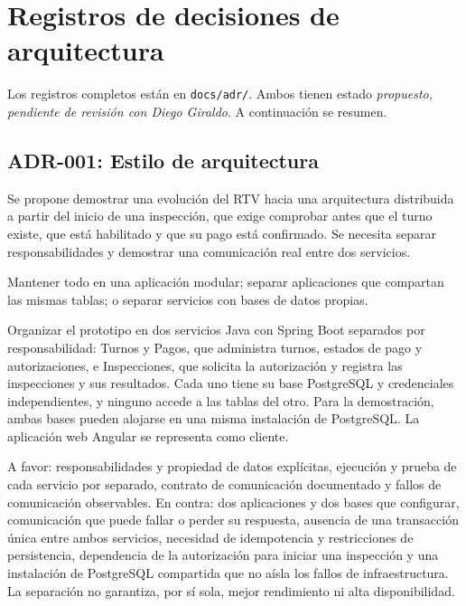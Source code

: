 \documentclass[11pt,a4paper]{article}
\begin{document}
\section{Registros de decisiones de arquitectura}
Los registros completos están en \texttt{docs/adr/}. Ambos tienen estado \emph{propuesto, pendiente de revisión con Diego Giraldo}. A continuación se resumen.

\subsection{ADR-001: Estilo de arquitectura}
\begin{description}[leftmargin=3.2cm,style=nextline]
  \item[Contexto] Se propone demostrar una evolución del RTV hacia una arquitectura distribuida a partir del inicio de una inspección, que exige comprobar antes que el turno existe, que está habilitado y que su pago está confirmado. Se necesita separar responsabilidades y demostrar una comunicación real entre dos servicios.
  \item[Opciones] Mantener todo en una aplicación modular; separar aplicaciones que compartan las mismas tablas; o separar servicios con bases de datos propias.
  \item[Decisión] Organizar el prototipo en dos servicios Java con Spring Boot separados por responsabilidad: Turnos y Pagos, que administra turnos, estados de pago y autorizaciones, e Inspecciones, que solicita la autorización y registra las inspecciones y sus resultados. Cada uno tiene su base PostgreSQL y credenciales independientes, y ninguno accede a las tablas del otro. Para la demostración, ambas bases pueden alojarse en una misma instalación de PostgreSQL. La aplicación web Angular se representa como cliente.
  \item[Consecuencias] A favor: responsabilidades y propiedad de datos explícitas, ejecución y prueba de cada servicio por separado, contrato de comunicación documentado y fallos de comunicación observables. En contra: dos aplicaciones y dos bases que configurar, comunicación que puede fallar o perder su respuesta, ausencia de una transacción única entre ambos servicios, necesidad de idempotencia y restricciones de persistencia, dependencia de la autorización para iniciar una inspección y una instalación de PostgreSQL compartida que no aísla los fallos de infraestructura. La separación no garantiza, por sí sola, mejor rendimiento ni alta disponibilidad.
\end{description}
\end{document}
